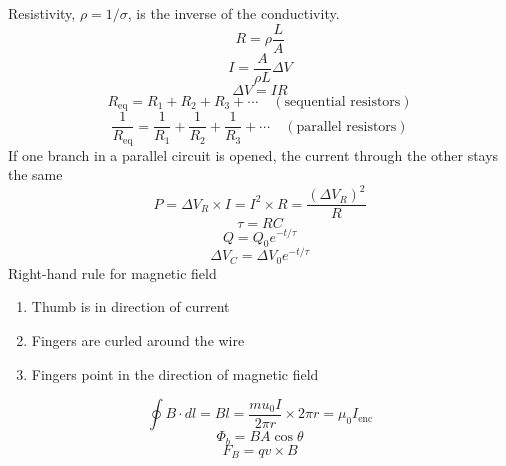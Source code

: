 \documentclass[twocolumn]{article}
\begin{document}
Resistivity, $\rho = 1/\sigma$, is the inverse of the conductivity.
\[R=\rho \frac{L}{A}\]
\[I=\frac{A}{\rho L}\Delta V\]
\[\Delta V = IR\]
\[R_\text{eq}=R_1 + R_2 + R_3 + \cdots\quad (\text{sequential resistors})\]
\[\frac{1}{R_\text{eq}}=\frac{1}{R_1} + \frac{1}{R_2} + \frac{1}{R_3} + \cdots\quad
(\text{parallel resistors})\]
If one branch in a parallel circuit is opened, the current through the other stays the same
\[P=\Delta V_R\times I = I^2\times R = \frac{{(\Delta V_R)}^2}{R}\]
\[\tau = RC\]
\[Q=Q_0 e^{-t/\tau}\]
\[\Delta V_C=\Delta V_0 e^{-t/\tau}\]
Right-hand rule for magnetic field
\begin{enumerate}
    \item Thumb is in direction of current
    \item Fingers are curled around the wire
    \item Fingers point in the direction of magnetic field
\end{enumerate}
\[\oint B\cdot dl = Bl = \frac{mu_0 I}{2\pi r}\times 2\pi r = \mu_0 I_\text{enc}\]
\[\Phi_b = BA\cos\theta\]
\[F_B=qv\times B\]
\end{document}
